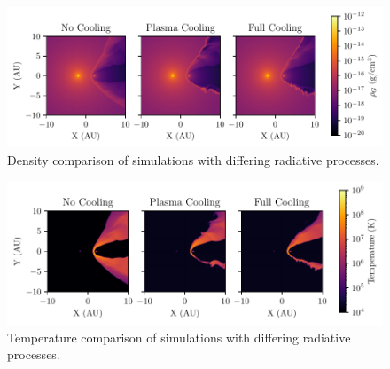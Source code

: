 \documentclass[fleqn,usenatbib]{mnras}
\begin{document}
\begin{figure}
  \centering
  \includegraphics{assets/results/radiative/radiative-crop-2-rho.pdf}
  \caption[Density comparison of simulations with differing radiative processes]{Density comparison of simulations with differing radiative processes.}
  \label{fig:postshockcompression}
\end{figure}

\begin{figure}
  \centering
  \includegraphics{assets/results/radiative/radiative-crop-2-temp.pdf}
  \caption[Temperature comparison of simulations with differing radiative processes]{Temperature comparison of simulations with differing radiative processes.}
  \label{fig:postshocktemperature}
\end{figure}
\end{document}

